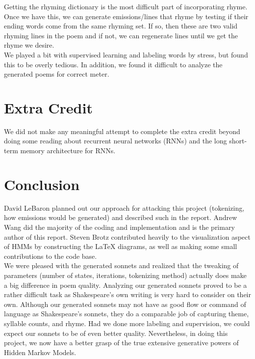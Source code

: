 \documentclass[11pt]{article}
\begin{document}
\noindent Getting the rhyming dictionary is the most difficult part of incorporating rhyme. Once we have this, we can generate emissions/lines that rhyme by testing if their ending words come from the same rhyming set. If so, then these are two valid rhyming lines in the poem and if not, we can regenerate lines until we get the rhyme we desire. \\

\noindent We played a bit with supervised learning and labeling words by stress, but found this to be overly tedious. In addition, we found it difficult to analyze the generated poems for correct meter. 

\section*{Extra Credit}
We did not make any meaningful attempt to complete the extra credit beyond doing some reading about recurrent neural networks (RNNs) and the long short-term memory architecture for RNNs.

\section*{Conclusion}

David LeBaron planned out our approach for attacking this project (tokenizing, how emissions would be generated) and described such in the report. Andrew Wang did the majority of the coding and implementation and is the primary author of this report. Steven Brotz contributed heavily to the visualization aspect of HMMs by constructing the \LaTeX \hspace{1pt} diagrams, as well as making some small contributions to the code base. \\

\noindent We were pleased with the generated sonnets and realized that the tweaking of parameters (number of states, iterations, tokenizing method) actually does make a big difference in poem quality. Analyzing our generated sonnets proved to be a rather difficult task as Shakespeare's own writing is very hard to consider on their own. Although our generated sonnets may not have as good flow or command of language as Shakespeare's sonnets, they do a comparable job of capturing theme, syllable counts, and rhyme. Had we done more labeling and supervision, we could expect our sonnets to be of even better quality. Nevertheless, in doing this project, we now have a better grasp of the true extensive generative powers of Hidden Markov Models. 
\end{document}
